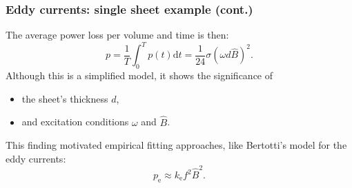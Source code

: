 \begin{frame}
	\frametitle{Eddy currents: single sheet example (cont.)}
	The average power loss per volume and time is then:
	$$
		p = \frac{1}{T}\int_0^T p(t) \mathrm{d}t = \frac{1}{24}\sigma\left(\omega d \hat{B}\right)^2.
	$$\pause
	Although this is a simplified model, it shows the significance of
	\begin{itemize}
		\item the sheet's thickness $d$,
		\item and excitation conditions $\omega$ and $\hat{B}$.
	\end{itemize}\pause
	\vspace{1em}
	This finding motivated empirical fitting approaches, like Bertotti's
	model for the eddy currents: $$p_{\mathrm{e}}\approx k_{\mathrm{e}} f^2 \hat{B}^2 .$$
\end{frame}

